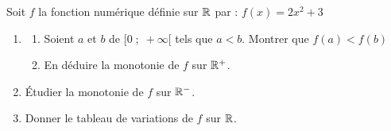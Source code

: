 \documentclass[10pt, a4paper]{article}
\begin{document}
\begin{Application}[][35 min]
Soit $f$ la fonction numérique définie sur $\mathbb{R}$ par : $f(x) = 2x^2 + 3$
\begin{enumerate}[leftmargin=*,itemsep=0.5pt]
    \item
    \begin{enumerate}[leftmargin=*,itemsep=0.5pt]
        \item Soient $a$ et $b$ de $\big[0 \;;\; +\infty\big[$ tels que $a < b$. Montrer que $f(a) < f(b)$
        \item En déduire la monotonie de $f$ sur $\mathbb{R}^+$.
    \end{enumerate}
    \item Étudier la monotonie de $f$ sur $\mathbb{R}^-$.
    \item Donner le tableau de variations de $f$ sur $\mathbb{R}$.
\end{enumerate}
\end{Application}
\end{document}
